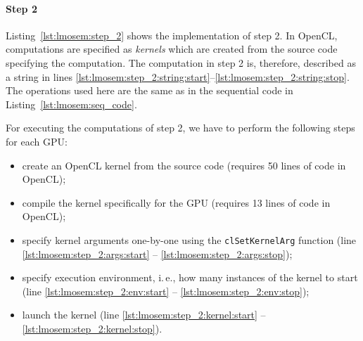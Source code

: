 \paragraph{Step 2}
Listing~\ref{lst:lmosem:step_2} shows the implementation of step 2.
In OpenCL, computations are specified as \emph{kernels} which are created from the source code specifying the computation.
The computation in step 2 is, therefore, described as a string in lines \ref{lst:lmosem:step_2:string:start}--\ref{lst:lmosem:step_2:string:stop}.
The operations used here are the same as in the sequential code in Listing~\ref{lst:lmosem:seq_code}.

For executing the computations of step 2, we have to perform the following steps for each GPU:
\begin{itemize}
  \item create an OpenCL kernel from the source code (requires 50 lines of code in OpenCL);
  \item compile the kernel specifically for the GPU (requires 13 lines of code in OpenCL);
  \item specify kernel arguments one-by-one using the \texttt{clSetKernelArg} function (line \ref{lst:lmosem:step_2:args:start} -- \ref{lst:lmosem:step_2:args:stop});
  \item specify execution environment, i.\,e., how many instances of the kernel to start (line \ref{lst:lmosem:step_2:env:start} -- \ref{lst:lmosem:step_2:env:stop});
  \item launch the kernel (line \ref{lst:lmosem:step_2:kernel:start} -- \ref{lst:lmosem:step_2:kernel:stop}).
\end{itemize}
